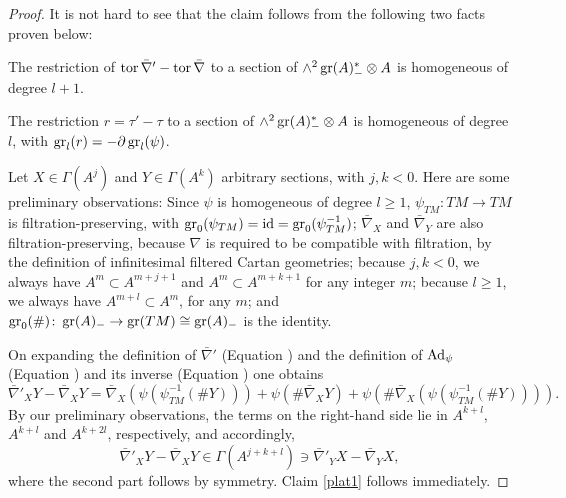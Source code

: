 \documentclass[leqno,12pt]{amsart} %
\begin{document}
\begin{proof}
  It is not hard to see that the claim follows from the following two facts proven below:
  \begin{conditions}
  \item\label{plat1} The restriction of $\operatorname{tor} \bar\nabla' - \operatorname{tor} \bar\nabla$ to a
    section of $\wedge^2\operatorname{\operatorname{gr}}(A)_{-}^*\otimes A$ is homogeneous of degree $l + 1$.
  \item\label{plat2}
    The restriction $r = \tau' - \tau $ to a section of $\wedge^2\operatorname{\operatorname{gr}}(A)_{-}^*\otimes
    A$ is homogeneous of degree $l$, with $\operatorname{\operatorname{gr}}_l (r) = -\partial\operatorname{\operatorname{gr}}_l(\psi)$.
  \end{conditions}

  Let $X \in \Gamma(A^j)$ and $Y \in \Gamma(A^k)$ arbitrary sections, with $j, k <
  0$. Here are some preliminary observations: Since $\psi$ is homogeneous of degree
  $l \ge 1$, $\psi_{TM} \colon TM \rightarrow TM $ is filtration-preserving, with
  $\operatorname{\operatorname{gr}}_0(\psi_{TM})=\mathrm{id}= \operatorname{\operatorname{gr}}_0(\psi_{TM}^{-1})$; $\bar\nabla_X$ and
  $\bar\nabla_Y$ are also filtration-preserving, because $\nabla $ is required to be
  compatible with filtration, by the definition of infinitesimal filtered Cartan
  geometries; because $j, k < 0$, we always have $A^m \subset A^{m + j + 1}$ and
  $A^m \subset A^{m + k + 1}$ for any integer $m$; because $l\ge 1$, we always have
  $A^{m +l} \subset A^m$, for any $m$; and
  $\operatorname{\operatorname{gr}}_0(\#) \colon \operatorname{\operatorname{gr}}(A)_{-} \rightarrow \operatorname{\operatorname{gr}}(TM)\cong \operatorname{\operatorname{gr}}(A)_{-}$ is the
  identity.

  On expanding the definition of $\bar\nabla'$ (Equation )
  and the definition of $\operatorname{Ad}_\psi$ (Equation ) and its
  inverse (Equation ) one obtains
  \begin{equation*}
    \bar\nabla'_XY - \bar\nabla_XY  =\bar\nabla_X(\psi(\psi_{TM}^{-1}(\#Y))) +
    \psi(\#\bar\nabla_XY) +
    \psi(\#\bar\nabla_X(\psi(\psi_{TM}^{-1}(\#Y)))).
  \end{equation*}
  By our preliminary observations, the terms on the right-hand side lie in
  $A^{k+l}$, $A^{k+l}$ and $A^{k + 2l}$, respectively, and accordingly,
  \begin{equation*}
    \bar\nabla'_XY - \bar\nabla_XY \in \Gamma(A^{j+k+l}) \ni
      \bar\nabla'_YX - \bar\nabla_YX,
  \end{equation*}
  where the second part follows by symmetry. Claim \eqref{plat1} follows immediately.


\end{proof}
\end{document}
